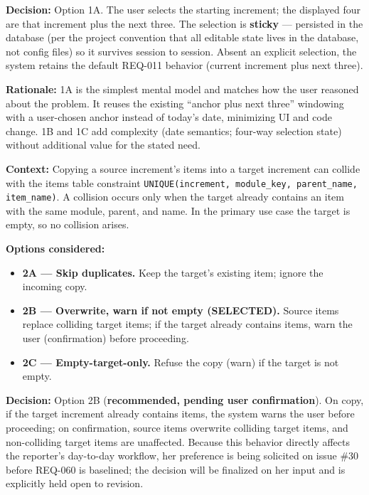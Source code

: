 {\begin{enumerate}
\textbf{Decision:} Option 1A. The user selects the starting increment; the
displayed four are that increment plus the next three. The selection is
\textbf{sticky} --- persisted in the database (per the project convention that all
editable state lives in the database, not config files) so it survives session to
session. Absent an explicit selection, the system retains the default REQ-011
behavior (current increment plus next three).

\textbf{Rationale:} 1A is the simplest mental model and matches how the user
reasoned about the problem. It reuses the existing ``anchor plus next three''
windowing with a user-chosen anchor instead of today's date, minimizing UI and
code change. 1B and 1C add complexity (date semantics; four-way selection state)
without additional value for the stated need.


\textbf{Context:} Copying a source increment's items into a target increment can
collide with the items table constraint
\texttt{UNIQUE(increment, module\_key, parent\_name, item\_name)}. A collision
occurs only when the target already contains an item with the same module,
parent, and name. In the primary use case the target is empty, so no collision
arises.

\textbf{Options considered:}
\begin{itemize}
    \item \textbf{2A --- Skip duplicates.} Keep the target's existing item; ignore
    the incoming copy.
    \item \textbf{2B --- Overwrite, warn if not empty (SELECTED).} Source items
    replace colliding target items; if the target already contains items, warn the
    user (confirmation) before proceeding.
    \item \textbf{2C --- Empty-target-only.} Refuse the copy (warn) if the target
    is not empty.
\end{itemize}

\textbf{Decision:} Option 2B (\textbf{recommended, pending user confirmation}). On
copy, if the target increment already contains items, the system warns the user
before proceeding; on confirmation, source items overwrite colliding target
items, and non-colliding target items are unaffected. Because this behavior
directly affects the reporter's day-to-day workflow, her preference is being
solicited on issue \#30 before REQ-060 is baselined; the decision will be
finalized on her input and is explicitly held open to revision.


\end{enumerate}}
